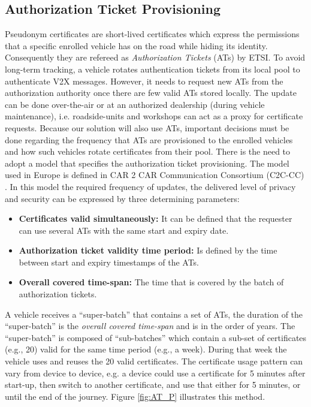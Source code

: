 \subsection{Authorization Ticket Provisioning}
\label{section:at_usage}

Pseudonym certificates are short-lived certificates which express the permissions that a specific enrolled vehicle has on the road while hiding its identity. Consequently they are refereed as \textit{Authorization Tickets} (ATs) by ETSI. To avoid long-term tracking, a vehicle rotates authentication tickets from its local pool to authenticate V2X messages. However, it needs to request new ATs from the authorization authority once there are few valid ATs stored locally. The update can be done over-the-air or at an authorized dealership (during vehicle maintenance), i.e. roadside-units and workshops can act as a proxy for certificate requests. Because our solution will also use ATs, important decisions must be done regarding the frequency that ATs are provisioned to the enrolled vehicles and how such vehicles rotate certificates from their pool. There is the need to adopt a model that specifies the authorization ticket provisioning. The model used in Europe is defined in CAR 2 CAR Communication Consortium (C2C-CC) \cite{generic_eu}. In this model the required frequency of updates, the delivered level of privacy and security can be expressed by three determining parameters:

\begin{itemize}
	\item{ \textbf{Certificates valid simultaneously:} It can be defined that the requester can use several ATs with the same start and expiry date.} 
	\item{ \textbf{Authorization ticket validity time period:} Is defined by the time between start and expiry timestamps of the ATs.}
	\item{ \textbf{Overall covered time-span:} The time that is covered by the batch of authorization tickets.}
\end{itemize}

A vehicle receives a ``super-batch''  that contains a set of ATs, the duration of the ``super-batch'' is the \textit{overall covered time-span} and is in the order of years. The ``super-batch'' is composed of ``sub-batches'' which contain a sub-set of certificates (e.g., 20) valid for the same time period (e.g., a week). During that week the vehicle uses and reuses the 20 valid certificates. The certificate usage pattern can vary from device to device, e.g. a device could use a certificate for 5 minutes after start-up, then switch to another certificate, and use that either for 5 minutes, or until the end of the journey. Figure \ref{fig:AT_P} illustrates this method. 

